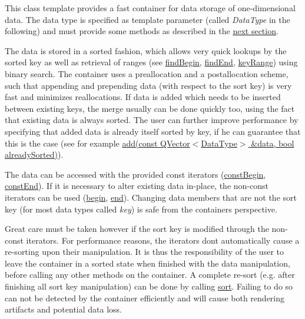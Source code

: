 This class template provides a fast container for data storage of one-\/dimensional data. The data type is specified as template parameter (called {\itshape Data\+Type} in the following) and must provide some methods as described in the \hyperlink{classQCPDataContainer_qcpdatacontainer-datatype}{next section}.

The data is stored in a sorted fashion, which allows very quick lookups by the sorted key as well as retrieval of ranges (see \hyperlink{classQCPDataContainer_a8ffcab551fd06dd037874ef644c73467}{find\+Begin}, \hyperlink{classQCPDataContainer_ad9b6b0343252eb3bbd591ee28aaa4e9d}{find\+End}, \hyperlink{classQCPDataContainer_aba6e1a93c21ccc56a432b4a02c9d0ed2}{key\+Range}) using binary search. The container uses a preallocation and a postallocation scheme, such that appending and prepending data (with respect to the sort key) is very fast and minimizes reallocations. If data is added which needs to be inserted between existing keys, the merge usually can be done quickly too, using the fact that existing data is always sorted. The user can further improve performance by specifying that added data is already itself sorted by key, if he can guarantee that this is the case (see for example \hyperlink{classQCPDataContainer_a51d2a4c9ce4baf5e950b767d26673972}{add(const Q\+Vector$<$\+Data\+Type$>$ \&data, bool already\+Sorted)}).

The data can be accessed with the provided const iterators (\hyperlink{classQCPDataContainer_a02360beeb3484df7c20f20c8f3ed4bb2}{const\+Begin}, \hyperlink{classQCPDataContainer_ad007d9955a4fb2ec1f7e07532b59d169}{const\+End}). If it is necessary to alter existing data in-\/place, the non-\/const iterators can be used (\hyperlink{classQCPDataContainer_a80032518413ab8f418f7c81182fd06cb}{begin}, \hyperlink{classQCPDataContainer_acf66dfad83fe041380f5e0491e7676f2}{end}). Changing data members that are not the sort key (for most data types called {\itshape key}) is safe from the container\textquotesingle{}s perspective.

Great care must be taken however if the sort key is modified through the non-\/const iterators. For performance reasons, the iterators don\textquotesingle{}t automatically cause a re-\/sorting upon their manipulation. It is thus the responsibility of the user to leave the container in a sorted state when finished with the data manipulation, before calling any other methods on the container. A complete re-\/sort (e.\+g. after finishing all sort key manipulation) can be done by calling \hyperlink{classQCPDataContainer_a75da92e33063b63d6da5014683591d45}{sort}. Failing to do so can not be detected by the container efficiently and will cause both rendering artifacts and potential data loss.

